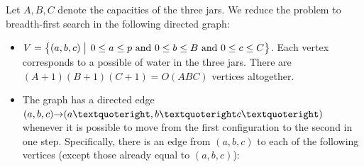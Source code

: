 \documentclass[11pt]{article}
\begin{document}
\begin{enumerate}
\begin{solution}
Let $A,B,C$ denote the capacities of the three jars.  We reduce the problem to breadth-first search in the following directed graph:
\begin{itemize}
\item
$V = \Setbar{(a,b,c)\strut}{0\le a\le p \text{~and~} 0\le b\le B \text{~and~} 0 \le c\le C}$.  Each vertex corresponds to a possible  of water in the three jars.  There are $(A+1)(B+1)(C+1) = O(ABC)$ vertices altogether.

\item
The graph has a directed edge $(a,b,c)\arcto(a’,b’c’)$ whenever it is possible to move from the first configuration to the second in one step.  Specifically, there is an edge from $(a,b,c)$ to each of the following vertices (except those already equal to $(a,b,c)$):
\end{itemize}
\end{solution}
\end{enumerate}
\end{document}
